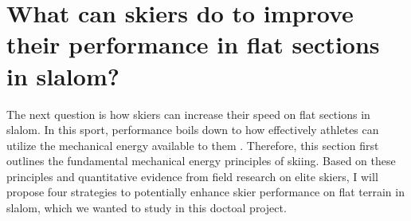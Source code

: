 \section{What can skiers do to improve their performance in flat sections in slalom?}
The next question is how skiers can increase their speed on flat sections in slalom. In this sport, performance boils down to how effectively athletes can utilize the mechanical energy available to them \cite{supej_differential_2008, supej_how_2010}. Therefore, this section first outlines the fundamental mechanical energy principles of skiing. Based on these principles and quantitative evidence from field research on elite skiers, I will propose four strategies to potentially enhance skier performance on flat terrain in slalom, which we wanted to study in this doctoal project.  

